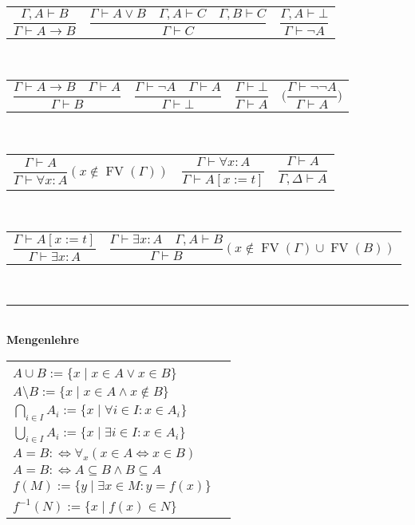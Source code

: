 \documentclass[a4paper,10pt,fleqn,twoside,twocolumn,dvipdfmx]{scrartcl}
\newcommand{\strong}[1]{\textsf{\textbf{#1}}}
\begin{document}
\begin{tabular}{@{}lll}
$\dfrac{\Gamma, A\vdash B}{\Gamma\vdash A\to B}$
& $\dfrac{\Gamma\vdash A\lor B\quad\Gamma,A\vdash C\quad\Gamma,B\vdash C}{\Gamma\vdash C}$
& $\dfrac{\Gamma,A\vdash\bot}{\Gamma\vdash\neg A}$
\end{tabular}\\[6pt]
\begin{tabular}{@{}l@{\quad}l@{\quad}l@{\quad}l}
$\dfrac{\Gamma\vdash A\to B\quad\Gamma\vdash A}{\Gamma\vdash B}$
& $\dfrac{\Gamma\vdash\neg A\quad\Gamma\vdash A}{\Gamma\vdash\bot}$
& $\dfrac{\Gamma\vdash\bot}{\Gamma\vdash A}$
& $\bigg(\dfrac{\Gamma\vdash\neg\neg A}{\Gamma\vdash A}\bigg)$
\end{tabular}\\[6pt]
\begin{tabular}{@{}l@{\qquad}l@{\qquad}l}
$\dfrac{\Gamma\vdash A}{\Gamma\vdash\forall x\colon A}(x\notin\operatorname{FV}(\Gamma))$
& $\dfrac{\Gamma\vdash\forall x\colon A}{\Gamma\vdash A[x:=t]}$
& $\dfrac{\Gamma\vdash A}{\Gamma,\Delta\vdash A}$
\end{tabular}\\[6pt]
\begin{tabular}{@{}l@{\qquad}l}
$\dfrac{\Gamma\vdash A[x:=t]}{\Gamma\vdash\exists x\colon A}$
& $\dfrac{\Gamma\vdash\exists x\colon A\quad\Gamma,A\vdash B}{\Gamma\vdash B}
(x\notin\operatorname{FV}(\Gamma)\cup\operatorname{FV}(B))$
\end{tabular}\\[6pt]
\rule{\columnwidth}{\heavyrulewidth}\\
\strong{Mengenlehre}\\[2pt]
\begin{tabular}{@{}l@{\;\,}|@{\;\;}l}
\makecell[lt]{
$A\cap B := \{x\mid x\in A\land x\in B\}$\\
$A\cup B := \{x\mid x\in A\lor x\in B\}$\\
$A\setminus B := \{x\mid x\in A\land x\notin B\}$\\
$\bigcap_{i\in I} A_i := \{x\mid \forall i{\in}I\colon x{\in}A_i\}$\\
$\bigcup_{i\in I} A_i := \{x\mid \exists i{\in}I\colon x{\in}A_i\}$
}
&\makecell[lt]{
$A\subseteq B :\Leftrightarrow \forall_{\!x}(x\in A\Rightarrow x\in B)$\\
$A=B :\Leftrightarrow \forall_{\!x}(x\in A\Leftrightarrow x\in B)$\\
$A=B :\Leftrightarrow A\subseteq B\land B\subseteq A$\\
$f(M) := \{y\mid\exists x{\in}M\colon y{=}f(x)\}$\\
$f^{-1}(N) := \{x\mid f(x)\in N\}$
}
\end{tabular}\\
\end{document}
